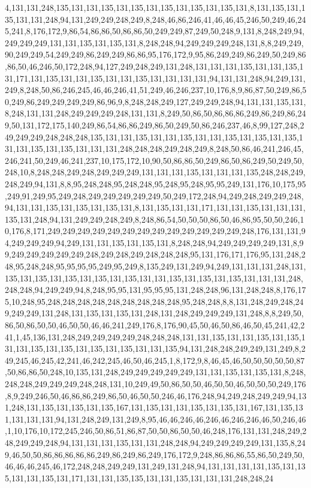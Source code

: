 4,131,131,248,135,131,131,135,131,135,131,135,131,135,131,135,131,8,131,135,131,135,131,131,248,94,131,249,249,248,249,8,248,46,86,246,41,46,46,45,246,50,249,46,245,241,8,176,172,9,86,54,86,86,50,86,86,50,249,249,87,249,50,248,9,131,8,248,249,94,249,249,249,131,131,135,131,135,131,8,248,248,94,249,249,249,248,131,8,8,249,249,90,249,249,54,249,249,86,249,249,86,86,95,176,172,9,95,86,249,249,86,249,50,249,86,86,50,46,246,50,172,248,94,127,249,248,249,131,248,131,131,131,135,131,131,135,131,171,131,135,131,131,135,131,131,135,131,131,131,131,94,131,131,248,94,249,131,249,8,248,50,86,246,245,46,46,246,41,51,249,46,246,237,10,176,8,9,86,87,50,249,86,50,249,86,249,249,249,249,86,96,9,8,248,248,249,127,249,249,248,94,131,131,135,131,8,248,131,131,248,249,249,249,248,131,131,8,249,50,86,50,86,86,86,249,86,249,86,249,50,131,172,175,140,249,86,54,86,86,249,86,50,249,50,86,246,237,46,8,99,127,248,249,249,249,248,248,248,135,131,131,135,131,131,135,131,131,135,131,135,131,135,131,131,135,131,135,131,131,131,248,248,248,249,248,249,8,248,50,86,46,241,246,45,246,241,50,249,46,241,237,10,175,172,10,90,50,86,86,50,249,86,50,86,249,50,249,50,248,10,8,248,248,249,248,249,249,249,131,131,131,135,131,131,131,135,248,248,249,248,249,94,131,8,8,95,248,248,95,248,248,95,248,95,248,95,95,249,131,176,10,175,95,249,91,249,95,249,248,249,249,249,249,249,50,249,172,248,94,249,248,249,249,248,94,131,131,135,131,135,131,135,131,8,131,135,131,131,171,131,131,135,131,131,131,135,131,248,94,131,249,249,248,249,8,248,86,54,50,50,50,86,50,46,86,95,50,50,246,10,176,8,171,249,249,249,249,249,249,249,249,249,249,249,249,249,248,176,131,131,94,249,249,249,94,249,131,131,135,131,135,131,8,248,248,94,249,249,249,249,131,8,99,249,249,249,249,249,248,249,248,249,248,248,248,95,131,176,171,176,95,131,248,248,95,248,248,95,95,95,95,249,95,249,8,135,249,131,249,94,249,131,131,131,248,131,135,131,135,131,135,131,135,131,135,131,131,135,131,135,131,135,131,131,131,248,248,248,94,249,249,94,8,248,95,95,131,95,95,95,131,248,248,96,131,248,248,8,176,175,10,248,95,248,248,248,248,248,248,248,248,248,95,248,248,8,8,131,248,249,248,249,249,249,131,248,131,135,131,135,131,248,131,248,249,249,249,131,248,8,8,249,50,86,50,86,50,50,46,50,50,46,46,241,249,176,8,176,90,45,50,46,50,86,46,50,45,241,42,241,1,45,136,131,248,249,249,249,249,248,248,248,131,131,135,131,131,135,131,135,131,131,135,131,135,131,135,131,135,131,131,135,94,131,248,248,249,249,131,249,8,249,245,46,245,42,241,46,242,245,46,50,46,245,1,8,172,9,8,46,45,46,50,50,50,50,50,87,50,86,86,50,248,10,135,131,248,249,249,249,249,249,131,131,135,131,135,131,8,248,248,248,249,249,249,248,248,131,10,249,49,50,86,50,50,46,50,50,46,50,50,50,249,176,8,9,249,246,50,46,86,86,249,86,50,46,50,50,246,46,176,248,94,249,248,249,249,94,131,248,131,135,131,135,131,135,167,131,135,131,131,135,131,135,131,167,131,135,131,131,131,131,94,131,248,249,131,249,8,95,46,46,246,46,246,46,246,246,46,50,246,46,1,10,176,10,172,245,246,50,86,51,86,87,50,50,86,50,50,46,248,176,131,131,248,249,248,249,249,248,94,131,131,131,135,131,131,248,248,94,249,249,249,249,131,135,8,249,46,50,50,86,86,86,86,86,249,86,249,86,249,176,172,9,248,86,86,86,55,86,50,249,50,46,46,46,245,46,172,248,248,249,249,131,249,131,248,94,131,131,131,131,135,131,135,131,131,135,131,171,131,131,135,135,131,131,135,131,131,131,248,248,24